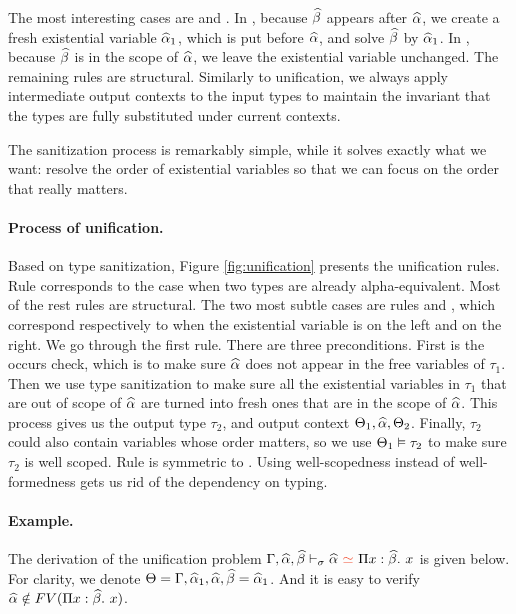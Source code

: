 The most interesting cases are  and . In
, because $\widehat{\beta}$ appears after $\widehat{\alpha}$, we create a fresh
existential variable $\widehat{\alpha}_1$, which is put before $\widehat{\alpha}$, and solve $\widehat{\beta}$
by $\widehat{\alpha}_1$. In , because $\widehat{\beta}$ is in the scope of $\widehat{\alpha}$,
we leave the existential variable unchanged.
The remaining rules are structural.
Similarly to unification, we always apply intermediate output
contexts to the input types to maintain the invariant that the types are fully
substituted under current contexts.

The sanitization process is remarkably simple, while it solves exactly what we
want: resolve the order of existential variables so that we can focus on the
order that really matters.

\paragraph{Process of unification.}

Based on type sanitization, Figure \ref{fig:unification} presents the
unification rules.
Rule  corresponds to the case when two types are already
alpha-equivalent. Most of the rest rules are structural. The two most subtle cases
are rules  and , which correspond respectively to
when the existential variable is on the left and on the right. We go through the
first rule. There are three preconditions. First is the occurs check, which is to
make sure $\widehat{\alpha}$ does not appear in the free variables of $\tau_1$. Then we use
type sanitization to make sure all the existential variables in $\tau_1$ that
are out of scope of $\widehat{\alpha}$ are turned into fresh ones that are in the scope of
$\widehat{\alpha}$. This process gives us the output type $\tau_2$, and output context
$\Theta_1, \widehat{\alpha}, \Theta_2$. Finally, $\tau_2$ could also contain variables whose
order matters, so we use $\Theta_1 \vDash \tau_2$ to make sure $\tau_2$ is well
scoped. Rule  is symmetric to . Using
well-scopedness instead of well-formedness gets us rid of the dependency on
typing.

\paragraph{Example.}

The derivation of the unification problem $\tctx, \genA, \genB \bysuni \genA
\uni \bpi x \genB x$ is given below. For clarity, we denote $\Theta =
\Gamma,\widehat{\alpha}_1,\widehat{\alpha},\widehat{\beta} =\widehat{\alpha}_1$. And it is easy to verify $\widehat{\alpha} \notin
FV(\Pi x:\widehat{\beta}.~ x)$.

